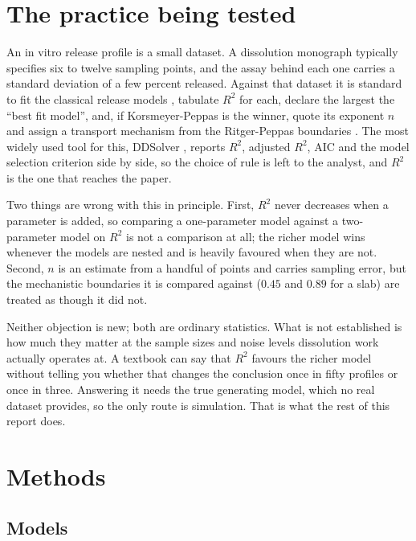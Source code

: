 \documentclass[11pt,a4paper]{article}
\begin{document}
\section{The practice being tested}

An in vitro release profile is a small dataset. A dissolution monograph
typically specifies six to twelve sampling points, and the assay behind each
one carries a standard deviation of a few percent released. Against that
dataset it is standard to fit the classical release models
\cite{higuchi1963,korsmeyer1983,costa2001}, tabulate $R^2$ for each, declare
the largest the ``best fit model'', and, if Korsmeyer-Peppas is the winner,
quote its exponent $n$ and assign a transport mechanism from the
Ritger-Peppas boundaries \cite{ritger1987a,ritger1987b}. The most widely used
tool for this, DDSolver \cite{zhang2010}, reports $R^2$, adjusted $R^2$, AIC
and the model selection criterion side by side, so the choice of rule is left
to the analyst, and $R^2$ is the one that reaches the paper.

Two things are wrong with this in principle. First, $R^2$ never decreases when
a parameter is added, so comparing a one-parameter model against a
two-parameter model on $R^2$ is not a comparison at all; the richer model wins
whenever the models are nested and is heavily favoured when they are not.
Second, $n$ is an estimate from a handful of points and carries sampling
error, but the mechanistic boundaries it is compared against
($0.45$ and $0.89$ for a slab) are treated as though it did not.

Neither objection is new; both are ordinary statistics. What is not
established is how much they matter at the sample sizes and noise levels
dissolution work actually operates at. A textbook can say that $R^2$ favours
the richer model without telling you whether that changes the conclusion once
in fifty profiles or once in three. Answering it needs the true generating
model, which no real dataset provides, so the only route is simulation. That
is what the rest of this report does.

\section{Methods}

\subsection{Models}
\end{document}
